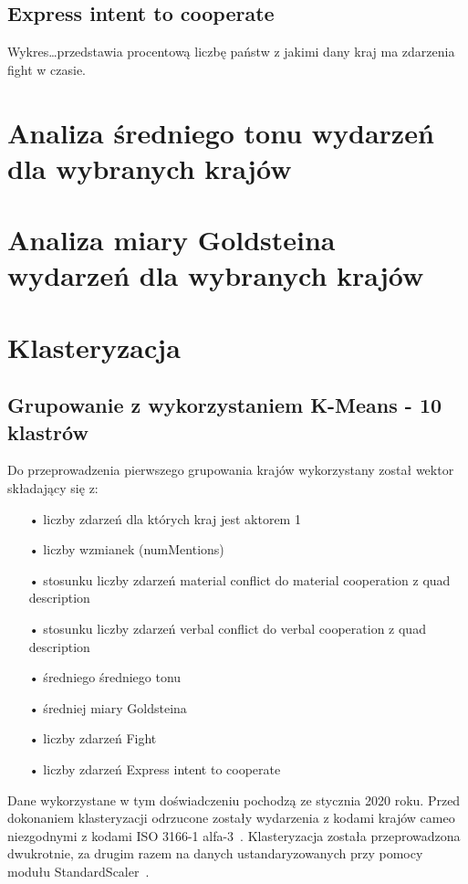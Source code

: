 \documentclass[11pt]{report}
\begin{document}
    \subsection{Express intent to cooperate}

    Wykres\ldots przedstawia procentową liczbę państw z jakimi dany kraj ma zdarzenia fight w czasie.


    \section{Analiza średniego tonu wydarzeń dla wybranych krajów}


    \section{Analiza miary Goldsteina wydarzeń dla wybranych krajów}


    \section{Klasteryzacja}

    \subsection{Grupowanie z wykorzystaniem K-Means - 10 klastrów}

    Do przeprowadzenia pierwszego grupowania krajów wykorzystany został wektor składający się z:
    \begin{enumerate}
        \item[•] liczby zdarzeń dla których kraj jest aktorem 1
        \item[•] liczby wzmianek (numMentions)
        \item[•] stosunku liczby zdarzeń material conflict do material cooperation z quad description
        \item[•] stosunku liczby zdarzeń verbal conflict do verbal cooperation z quad description
        \item[•] średniego średniego tonu
        \item[•] średniej miary Goldsteina
        \item[•] liczby zdarzeń Fight
        \item[•] liczby zdarzeń Express intent to cooperate
    \end{enumerate}
    Dane wykorzystane w tym doświadczeniu pochodzą ze stycznia 2020 roku.
    Przed dokonaniem klasteryzacji odrzucone zostały wydarzenia z kodami krajów cameo niezgodnymi z kodami ISO 3166-1 alfa-3~\cite{iso_alfa3}.
    Klasteryzacja została przeprowadzona dwukrotnie, za drugim razem na danych ustandaryzowanych przy pomocy modułu StandardScaler~\cite{standardScaler}.
\end{document}

